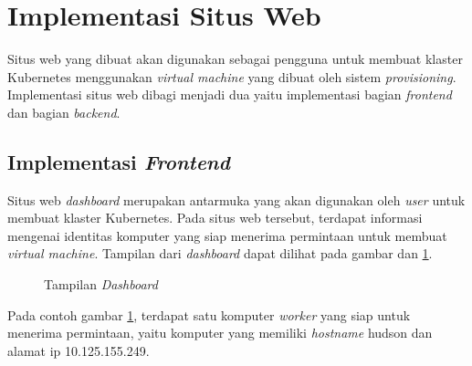 \section{Implementasi Situs Web}
\label{sec:implementas-situs-web}

Situs web yang dibuat akan digunakan sebagai pengguna untuk membuat
klaster Kubernetes menggunakan \emph{virtual machine} yang dibuat
oleh sistem \emph{provisioning}. Implementasi situs web dibagi menjadi
dua yaitu implementasi bagian \emph{frontend} dan bagian \emph{backend}.

\subsection{Implementasi \emph{Frontend}}
\label{subsec:implementas-frontend}

Situs web \emph{dashboard} merupakan antarmuka yang akan digunakan oleh \emph{user}
untuk membuat klaster Kubernetes. Pada situs web tersebut, terdapat
informasi mengenai identitas komputer yang siap
menerima permintaan untuk membuat \emph{virtual machine}.
Tampilan dari \emph{dashboard} dapat dilihat pada gambar
dan \ref{fig:dashboard-with-node}.

\begin{figure}[H]
  \centering
  \caption{Tampilan \emph{Dashboard}}
  \label{fig:dashboard-with-node}
\end{figure}

Pada contoh gambar \ref{fig:dashboard-with-node}, terdapat satu komputer \emph{worker}
yang siap untuk menerima permintaan, yaitu komputer yang memiliki \emph{hostname} hudson dan alamat
ip 10.125.155.249.

